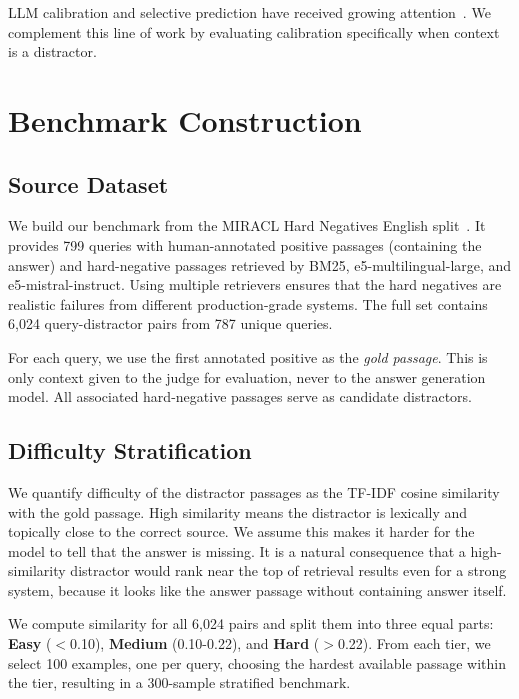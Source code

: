 \documentclass[sigconf,review,anonymous]{acmart}
\begin{document}
LLM calibration and selective prediction have received growing attention~\cite{kadavath2022language}.
We complement this line of work by evaluating calibration specifically when context is a distractor.

\section{Benchmark Construction}

\subsection{Source Dataset}

We build our benchmark from the MIRACL Hard Negatives English split~\cite{10.1162/tacl_a_00595,enevoldsen2025mmtebmassivemultilingualtext,muennighoff2022mteb}. 
It provides 799 queries with human-annotated positive passages (containing the answer) and hard-negative passages retrieved by BM25, e5-multilingual-large, and e5-mistral-instruct. 
Using multiple retrievers ensures that the hard negatives are realistic failures from different production-grade systems. 
The full set contains 6,024 query-distractor pairs from 787 unique queries.

For each query, we use the first annotated positive as the \textit{gold passage}. 
This is only context given to the judge for evaluation, never to the answer generation model. 
All associated hard-negative passages serve as candidate distractors.

\subsection{Difficulty Stratification}

We quantify difficulty of the distractor passages as the TF-IDF cosine similarity with the gold passage. 
High similarity means the distractor is lexically and topically close to the correct source. We assume this makes it harder for the model to tell that the answer is missing. 
It is a natural consequence that a high-similarity distractor would rank near the top of retrieval results even for a strong system, because it looks like the answer passage without containing answer itself.

We compute similarity for all 6,024 pairs and split them into three equal parts: \textbf{Easy} ($<$0.10), \textbf{Medium} (0.10-0.22), and \textbf{Hard} ($>$0.22). 
From each tier, we select 100 examples, one per query, choosing the hardest available passage within the tier, resulting in a 300-sample stratified benchmark.
\end{document}
